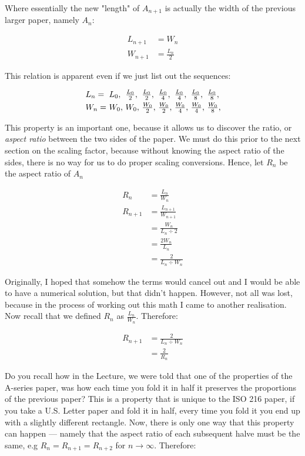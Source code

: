 \noindent
Where essentially the new "length" of $A_{n + 1}$ is actually the width of the previous larger paper, namely $A_{n}$:

\begin{align*}
  L_{n + 1} &= W_{n} \\
  W_{n + 1} &= \frac{L_{n}}{2}
\end{align*}

\noindent
This relation is apparent even if we just list out the sequences:

\[
  \begin{array}{*{8}{l@{\ }}}
    L_{n} = & L_{0}, & \frac{L_0}{2}, & \frac{L_{0}}{2}, & \frac{L_{0}}{4}, & \frac{L_{0}}{4}, & \frac{L_{0}}{8}, & \frac{L_{0}}{8}, \\[\jot]
    W_{n} = & W_{0}, &         W_{0}, & \frac{W_{0}}{2}, & \frac{W_{0}}{2}, & \frac{W_{0}}{4}, & \frac{W_{0}}{4}, & \frac{W_{0}}{8},
  \end{array}
\]

\noindent
This property is an important one, because it allows us to discover the ratio, or \emph{aspect ratio} between the two sides of the paper. We must do this prior to the next section on the scaling factor, because without knowing the aspect ratio of the sides, there is no way for us to do proper scaling conversions. Hence, let $R_{n}$ be the aspect ratio of $A_{n}$

\begin{align*}
  R_{n}     &= \frac{L_{n}}{W_{n}} \\
  R_{n + 1} &= \frac{L_{n + 1}}{W_{n + 1}} \\
            &= \frac{W_{n}}{L_{n} \div 2} \\
            &= \frac{2W_{n}}{L_{n}} \\
            &= \frac{2}{L_{n} \div W_{n}}
\end{align*}

\noindent
Originally, I hoped that somehow the terms would cancel out and I would be able to have a numerical solution, but that didn't happen. However, not all was lost, because in the process of working out this math I came to another realisation. Now recall that we defined $R_{n}$ as $\frac{L_{n}}{W_{n}}$. Therefore:

\begin{align*}
  R_{n + 1} &= \frac{2}{L_{n} \div W_{n}} \\
            &= \frac{2}{R_{n}}
\end{align*}

\noindent
Do you recall how in the Lecture, we were told that one of the properties of the A-series paper, was how each time you fold it in half it preserves the proportions of the previous paper? This is a property that is unique to the ISO 216 paper, if you take a U.S. Letter paper and fold it in half, every time you fold it you end up with a slightly different rectangle. Now, there is only one way that this property can happen --- namely that the aspect ratio of each subsequent halve must be the same, e.g $R_{n} = R_{n + 1} = R_{n + 2}$ for $n \to \infty$. Therefore:

